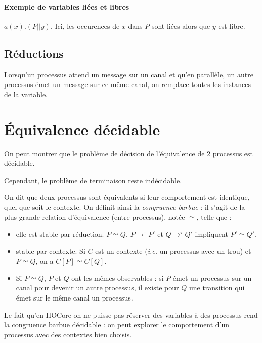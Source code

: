 \documentclass[11pt]{article}
\def\barbue{\simeq}
\begin{document}
\paragraph{Exemple de variables liées et libres} $a(x).(P||y)$. Ici, les occurences de $x$ dans $P$ sont liées alors que $y$ est libre. %




\subsection{Réductions}
Lorsqu'un processus attend un message sur un canal et qu'en parallèle, un autre processus émet un message sur ce même canal, on remplace toutes les instances de la variable.




\section{Équivalence décidable}
On peut montrer que le problème de décision de l'équivalence de 2 processus est décidable.

Cependant, le problème de terminaison reste indécidable.

On dit que deux processus sont équivalents si leur comportement est identique, quel que soit le contexte. On définit ainsi la \textit{congruence barbue} : il s'agit de la plus grande relation d'équivalence (entre processus), notée $\barbue$, telle que :
\begin{itemize}
\item elle est stable par réduction. $P\barbue Q$, $P\rightarrow^\tau P'$ et $Q\rightarrow^\tau Q'$ impliquent $P'\barbue Q'$.
\item stable par contexte. Si $C$ est un contexte (\textit{i.e.} un processus avec un trou) et $P\barbue Q$, on a $C[P]\barbue C[Q]$. 
\item Si $P\barbue Q$, $P$ et $Q$ ont les mêmes observables : si $P$ émet un processus sur un canal pour devenir un autre processus, il existe pour $Q$ une transition qui émet sur le même canal un processus.
\end{itemize}

Le fait qu'en HOCore on ne puisse pas réserver des variables à des processus rend la congruence barbue décidable : on peut explorer le comportement d'un processus avec des contextes bien choisis.
\end{document}
